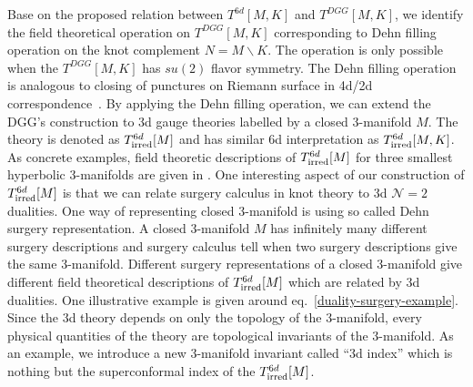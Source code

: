 \documentclass[a4paper,11pt]{article}
\begin{document}
Base on the proposed relation between $T^{6d}[M,K]$ and $T^{DGG}[M,K]$, we identify the field theoretical operation on $T^{DGG}[M,K]$  corresponding to Dehn filling operation on the knot complement $N=M\backslash K$. The operation is only possible when the $T^{DGG}[M,K]$ has $su(2)$ flavor symmetry.  The Dehn filling operation is analogous to closing of punctures on Riemann surface in 4d/2d correspondence~\cite{Tachikawa:2013kta}. By applying the Dehn filling operation, we can extend the DGG's construction to 3d gauge theories labelled by a closed 3-manifold $M$. The theory is denoted as $T^{6d}_{\rm irred}[M]$ and has similar 6d interpretation as $T^{6d}_{\rm irred}[M,K]$.   As concrete examples, field theoretic descriptions of $T^{6d}_{\rm irred}[M]$ for three smallest hyperbolic 3-manifolds are given in \cite{Gang:2017lsr}.  One interesting aspect of our construction of $T^{6d}_{\rm irred}[M]$ is that we can relate surgery calculus in knot theory to 3d $\mathcal{N}=2$ dualities.  One way of representing closed 3-manifold is using so called Dehn surgery representation. A closed 3-manifold $M$ has infinitely many different surgery descriptions and surgery calculus tell when two surgery descriptions give the same 3-manifold. Different surgery representations  of a closed 3-manifold give different field theoretical descriptions of $T^{6d}_{\rm irred}[M]$ which are related by 3d dualities. One illustrative example   is given around eq.~\eqref{duality-surgery-example}. Since the 3d theory depends on only the topology of the 3-manifold,  every physical quantities of the theory are topological invariants of the 3-manifold. As an example, we introduce a new 3-manifold  invariant called ``3d index'' which is nothing but the superconformal index of the $T^{6d}_{\rm irred}[M]$. 



\end{document}
